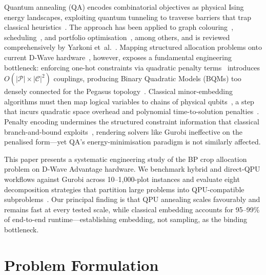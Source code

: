 \documentclass[conference]{IEEEtran}
\begin{document}
Quantum annealing (QA) encodes combinatorial objectives as physical Ising energy landscapes, exploiting quantum tunneling to traverse barriers that trap classical heuristics~\cite{albash2018adiabatic, preskillQuantumComputingNISQ2018}.
The approach has been applied to graph colouring~\cite{titiloye2011quantum}, scheduling~\cite{venturelli2015quantum}, and portfolio optimisation~\cite{venturelli2019reverse}, among others, and is reviewed comprehensively by Yarkoni et~al.~\cite{yarkoni2022quantum}.
Mapping structured allocation problems onto current D-Wave hardware~\cite{dwave2020advantage, dwave2022pegasus}, however, exposes a fundamental engineering bottleneck: enforcing one-hot constraints via quadratic penalty terms~\cite{glover2018tutorial, lucasIsingFormulationsMany2014, lucas2014ising} introduces $O(|\mathcal{P}|\!\times\!|\mathcal{C}|^{2})$ couplings, producing Binary Quadratic Models (BQMs) too densely connected for the Pegasus topology~\cite{boothby2020next}.
Classical minor-embedding algorithms must then map logical variables to chains of physical qubits~\cite{choi2008minor, choi2011minor, cai2014practical}, a step that incurs quadratic space overhead and polynomial time-to-solution penalties~\cite{prxquantum2040322, qute202300104, zbinden2020embedding}.
Penalty encoding undermines the structured constraint information that classical branch-and-bound exploits~\cite{wolsey1998integer}, rendering solvers like Gurobi ineffective on the penalised form---yet QA's energy-minimisation paradigm is not similarly affected.

This paper presents a systematic engineering study of the BP crop allocation problem on D-Wave Advantage hardware.
We benchmark hybrid and direct-QPU workflows against Gurobi across 10--1{,}000-plot instances and evaluate eight decomposition strategies that partition large problems into QPU-compatible subproblems~\cite{bass2021optimizing, booth2017partitioning}.
Our principal finding is that QPU annealing scales favourably and remains fast at every tested scale, while classical embedding accounts for 95--99\% of end-to-end runtime---establishing embedding, not sampling, as the binding bottleneck.

\section{Problem Formulation}
\label{sec:formulation}
\end{document}
